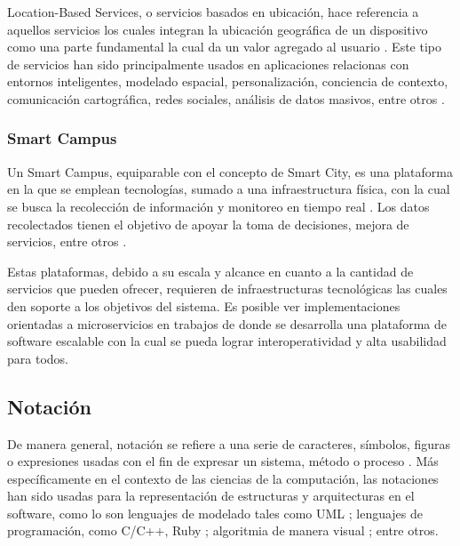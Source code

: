 Location-Based Services, o servicios basados en ubicación, hace referencia a aquellos servicios los cuales integran la ubicación geográfica de un dispositivo como una parte fundamental la cual da un valor agregado al usuario \cite{Schiller2004}. Este tipo de servicios han sido principalmente usados en aplicaciones relacionas con entornos inteligentes, modelado espacial, personalización, conciencia de contexto, comunicación cartográfica, redes sociales, análisis de datos masivos, entre otros \cite{Gartner2015,alliedmarketresearch2023}. 

\subsubsection{Smart Campus}


Un Smart Campus, equiparable con el concepto de Smart City, es una plataforma en la que se emplean tecnologías, sumado a una infraestructura física, con la cual se busca la recolección de información y monitoreo en tiempo real \cite{MinAllah2020}. Los datos recolectados tienen el objetivo de apoyar la toma de decisiones, mejora de servicios, entre otros \cite{Anagnostopoulos_2023}.

Estas plataformas, debido a su escala y alcance en cuanto a la cantidad de servicios que pueden ofrecer, requieren de 
infraestructuras tecnológicas las cuales den soporte a los objetivos del sistema. Es posible ver implementaciones orientadas a microservicios en trabajos de \citeauthor{henry_2020} \citeyear{henry_2020} donde se desarrolla una plataforma de software escalable con la cual se pueda lograr interoperatividad y alta usabilidad para todos.


\subsection{Notación}

De manera general, notación se refiere a una serie de caracteres, símbolos, figuras o expresiones usadas con el fin de expresar un sistema, método o proceso \cite{MerriamWebsterNotation}. Más específicamente en el contexto de las ciencias de la computación, las notaciones han sido usadas para la representación de estructuras y arquitecturas en el software, como lo son lenguajes de modelado tales como UML \cite{WhatIsUML}; lenguajes de programación, como C/C++, Ruby \cite{Bansal2013}; algoritmia de manera visual \cite{RutanenKalle2018McoO}; entre otros.


